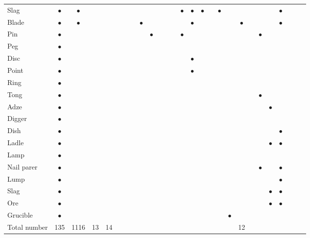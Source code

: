 {{{\begin{longtable}{|l|c|c|c|c|c|c|c|c|c|c|c|c|c|c|c|c|c|c|c|c|c|c|c|c|c|c|}
 Slag &$\bullet$&$\bullet$&&&&&&&&&&&$\bullet$&$\bullet$&$\bullet$&&$\bullet$&&&&&&$\bullet$&&& \\
Blade &$\bullet$&$\bullet$&&&&&&$\bullet$&&&&&&$\bullet$&&&&&$\bullet$&&&&$\bullet$&&& \\
Pin &$\bullet$&&&&&&&&$\bullet$&&&&$\bullet$&&&&&&&&$\bullet$&&&&& \\
Peg &$\bullet$&&&&&&&&&&&&&&&&&&&&&&&&& \\
Disc &$\bullet$&&&&&&&&&&&&&$\bullet$&&&&&&&&&&&& \\
Point &$\bullet$&&&&&&&&&&&&&$\bullet$&&&&&&&&&&&& \\
Ring &$\bullet$&&&&&&&&&&&&&&&&&&&&&&&&& \\
Tong &$\bullet$&&&&&&&&&&&&&&&&&&&&$\bullet$ &&&&& \\
Adze &$\bullet$&&&&&&&&&&&&&&&&&&&&&$\bullet$&&&& \\
Digger &$\bullet$&&&&&&&&&&&&&&&&&&&&&&&&& \\
Dish &$\bullet$&&&&&&&&&&&&&&&&&&&&&&$\bullet$&&& \\
Ladle &$\bullet$&&&&&&&&&&&&&&&&&&&&&$\bullet$&$\bullet$&&& \\
Lamp &$\bullet$&&&&&&&&&&&&&&&&&&&&&&&&& \\
Nail parer &$\bullet$&&&&&&&&&&&&&&&&&&&&$\bullet$&&$\bullet$&&& \\
Lump &$\bullet$&&&&&&&&&&&&&&&&&&&&&&$\bullet$&&& \\
Slag &$\bullet$&&&&&&&&&&&&&&&&&&&&&$\bullet$&$\bullet$&&& \\
Ore &$\bullet$&&&&&&&&&&&&&&&&&&&&&$\bullet$&$\bullet$&&& \\
Grucible &$\bullet$&&&&&&&&&&&&&&&&&$\bullet$&&&&&&&& \\
\hline
{Total number} &135 &1116& 13& 14&&&&&&&&&&&&&&&12&&&&&&& \\
\hline 
\end{longtable}
}}

}
